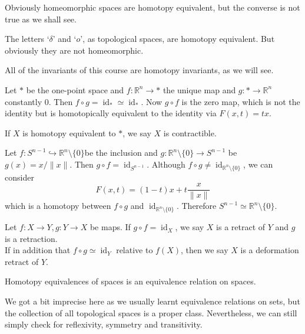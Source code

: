 Obviously homeomorphic spaces are homotopy equivalent, but the converse is not true as we shall see.
\begin{example}
    The letters `$\delta$' and `$o$', as topological spaces, are homotopy equivalent.
    But obviously they are not homeomorphic.
\end{example}
\begin{remark}
    All of the invariants of this course are homotopy invariants, as we will see.
\end{remark}
\begin{example}
    Let $\ast$ be the one-point space and $f:\mathbb R^n\to\ast$ the unique map and $g:\ast\to\mathbb R^n$ constantly $0$.
    Then $f\circ g=\operatorname{id}_\ast\simeq\operatorname{id}_\ast$.
    Now $g\circ f$ is the zero map, which is not the identity but is homotopically equivalent to the identity via $F(x,t)=tx$.
\end{example}
\begin{definition}
    If $X$ is homotopy equivalent to $\ast$, we say $X$ is contractible.
\end{definition}
\begin{example}
    Let $f:S^{n-1}\hookrightarrow\mathbb R^n\setminus\{0\}$be the inclusion and $g:\mathbb R^n\setminus\{0\}\to S^{n-1}$ be $g(x)=x/\|x\|$.
    Then $g\circ f=\operatorname{id}_{S^{n-1}}$.
    Although $f\circ g\neq\operatorname{id}_{\mathbb R^n\setminus\{0\}}$, we can consider
    $$F(x,t)=(1-t)x+t\frac{x}{\|x\|}$$
    which is a homotopy between $f\circ g$ and $\operatorname{id}_{\mathbb R^n\setminus\{0\}}$.
    Therefore $S^{n-1}\simeq \mathbb R^n\setminus\{0\}$.
\end{example}
\begin{definition}
    Let $f:X\to Y,g:Y\to X$ be maps.
    If $g\circ f=\operatorname{id}_X$, we say $X$ is a retract of $Y$ and $g$ is a retraction.\\
    If in addition that $f\circ g\simeq \operatorname{id}_Y$ relative to $f(X)$, then we say $X$ is a deformation retract of $Y$.
\end{definition}
\begin{lemma}
    Homotopy equivalences of spaces is an equivalence relation on spaces.
\end{lemma}
We got a bit imprecise here as we usually learnt equivalence relations on sets, but the collection of all topological spaces is a proper class.
Nevertheless, we can still simply check for reflexivity, symmetry and transitivity.
